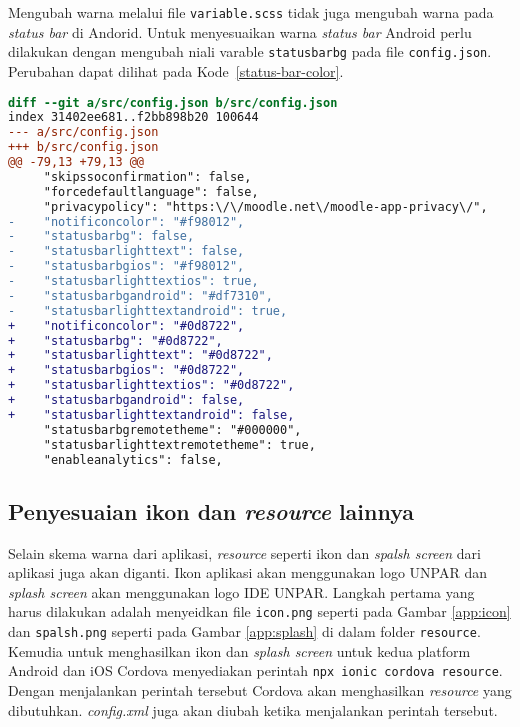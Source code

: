 Mengubah warna melalui file \texttt{variable.scss} tidak juga mengubah warna pada \textit{status bar} di Andorid. Untuk menyesuaikan warna \textit{status bar} Android perlu dilakukan dengan mengubah niali varable \texttt{statusbarbg} pada file \texttt{config.json}. Perubahan dapat dilihat pada \mbox{Kode \ref{status-bar-color}}. 

\begin{lstlisting}[language = diff, frame=single, label ={status-bar-color}, caption = Variable untuk mengubah warna dari \textit{status bar} pada config.json ]
diff --git a/src/config.json b/src/config.json
index 31402ee681..f2bb898b20 100644
--- a/src/config.json
+++ b/src/config.json
@@ -79,13 +79,13 @@
     "skipssoconfirmation": false,
     "forcedefaultlanguage": false,
     "privacypolicy": "https:\/\/moodle.net\/moodle-app-privacy\/",
-    "notificoncolor": "#f98012",
-    "statusbarbg": false,
-    "statusbarlighttext": false,
-    "statusbarbgios": "#f98012",
-    "statusbarlighttextios": true,
-    "statusbarbgandroid": "#df7310",
-    "statusbarlighttextandroid": true,
+    "notificoncolor": "#0d8722",
+    "statusbarbg": "#0d8722",
+    "statusbarlighttext": "#0d8722",
+    "statusbarbgios": "#0d8722",
+    "statusbarlighttextios": "#0d8722",
+    "statusbarbgandroid": false,
+    "statusbarlighttextandroid": false,
     "statusbarbgremotetheme": "#000000",
     "statusbarlighttextremotetheme": true,
     "enableanalytics": false,
\end{lstlisting}

\subsection{Penyesuaian ikon dan \textit{resource} lainnya}
Selain skema warna dari aplikasi, \textit{resource} seperti ikon dan \textit{spalsh screen} dari aplikasi juga akan diganti. Ikon aplikasi akan menggunakan logo UNPAR dan \textit{splash screen} akan menggunakan logo IDE UNPAR. Langkah pertama yang harus dilakukan adalah menyeidkan file \texttt{icon.png} seperti pada Gambar \ref{app:icon} dan \texttt{spalsh.png} seperti pada Gambar \ref{app:splash} di dalam folder \texttt{resource}. Kemudia untuk menghasilkan ikon dan \textit{splash screen} untuk kedua platform Android dan iOS Cordova menyediakan perintah \texttt{npx ionic cordova resource}. Dengan menjalankan perintah tersebut Cordova akan menghasilkan \textit{resource} yang dibutuhkan. \textit{config.xml} juga akan diubah ketika menjalankan perintah tersebut.

